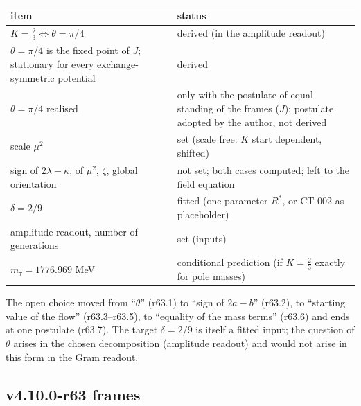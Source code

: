 \begin{center}
\small
\begin{tabular}{@{}>{\raggedright\arraybackslash}p{}>{\raggedright\arraybackslash}p{}@{}}
\toprule
item & status\\
\midrule
\(K=\tfrac23\Leftrightarrow\theta=\pi/4\) & derived (in the amplitude readout)\\
\(\theta=\pi/4\) is the fixed point of \(J\); stationary for every exchange-symmetric potential & derived\\
\(\theta=\pi/4\) realised & only with the postulate of equal standing of the frames (\(J\)); postulate adopted by the author, not derived\\
scale \(\mu^2\) & set (scale free: \(K\) start dependent, shifted)\\
sign of \(2\lambda-\kappa\), of \(\mu^2\), \(\zeta\), global orientation & not set; both cases computed; left to the field equation\\
\(\delta=2/9\) & fitted (one parameter \(R^*\), or CT-002 as placeholder)\\
amplitude readout, number of generations & set (inputs)\\
\(m_\tau=1776.969\) MeV & conditional prediction (if \(K=\tfrac23\) exactly for pole masses)\\
\bottomrule
\end{tabular}
\end{center}
The open choice moved from ``\(\theta\)'' (r63.1) to ``sign of \(2a-b\)'' (r63.2), to ``starting value of the flow'' (r63.3--r63.5), to ``equality
of the mass terms'' (r63.6) and ends at one postulate (r63.7).  The target \(\delta=2/9\) is itself a fitted input; the question of \(\theta\)
arises in the chosen decomposition (amplitude readout) and would not arise in this form in the Gram readout.

\subsection*{v4.10.0-r63 frames}
\label{subsec:v4100-r63-frames}

